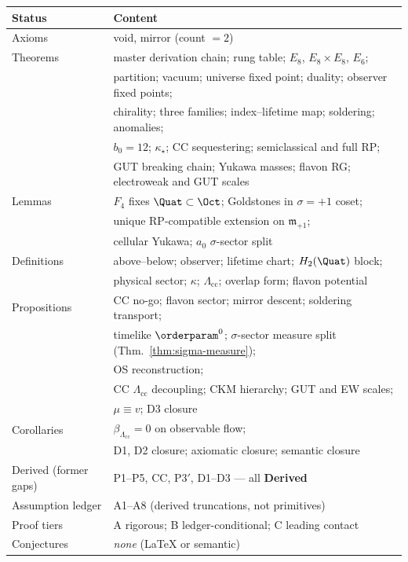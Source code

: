 \begin{center}
\small
\begin{tabular}{@{}ll@{}}
\toprule
\textbf{Status} & \textbf{Content} \\
\midrule
Axioms & void, mirror (count $=2$) \\
Theorems & master derivation chain; rung table; $E_8$, $E_8\times E_8$, $E_6$; \\
 & partition; vacuum; universe fixed point; duality; observer fixed points; \\
 & chirality; three families; index--lifetime map; soldering; anomalies; \\
 & $b_0=12$; $\kappa_\star$; CC sequestering; semiclassical and full RP; \\
 & GUT breaking chain; Yukawa masses; flavon RG; electroweak and GUT scales \\
Lemmas & $F_4$ fixes $\Quat\subset\Oct$; Goldstones in $\sigma=+1$ coset; \\
 & unique RP-compatible extension on $\mathfrak{m}_{+1}$; \\
 & cellular Yukawa; $a_0$ $\sigma$-sector split \\
Definitions & above--below; observer; lifetime chart; $H_2(\Quat)$ block; \\
 & physical sector; $\kappa$; $\Lambda_{\mathrm{cc}}$; overlap form; flavon potential \\
Propositions & CC no-go; flavon sector; mirror descent; soldering transport; \\
 & timelike $\orderparam^0$; $\sigma$-sector measure split (Thm.~\ref{thm:sigma-measure}); \\
 & OS reconstruction; \\
 & CC $\Lambda_{\mathrm{cc}}$ decoupling; CKM hierarchy; GUT and EW scales; \\
 & $\mu\equiv v$; D3 closure \\
Corollaries & $\beta_{\Lambda_{\mathrm{cc}}}=0$ on observable flow; \\
 & D1, D2 closure; axiomatic closure; semantic closure \\
Derived (former gaps) & P1--P5, CC, P3$'$, D1--D3 --- all \textbf{Derived} \\
Assumption ledger & A1--A8 (derived truncations, not primitives) \\
Proof tiers & A rigorous; B ledger-conditional; C leading contact \\
Conjectures & \emph{none} (LaTeX or semantic) \\
\bottomrule
\end{tabular}
\end{center}

